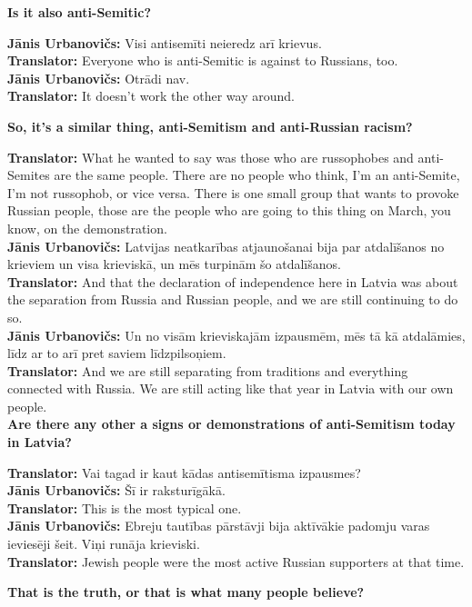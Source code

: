 \textbf{Is it also anti-Semitic?}  

\textbf{Jānis Urbanovičs:} Visi antisemīti neieredz arī krievus.\\ 
\textbf{Translator:} Everyone who is anti-Semitic is against to Russians, too.\\
\textbf{Jānis Urbanovičs:} Otrādi nav.\\ 
\textbf{Translator:} It doesn't work the other way around.  

\textbf{So, it’s a similar thing, anti-Semitism and anti-Russian racism?}  

\textbf{Translator:} What he wanted to say was those who are russophobes and anti-Semites are the same people. There are no people who think, I’m an anti-Semite, I’m not russophob, or vice versa. There is one small group that wants to provoke Russian people, those are the people who are going to this thing on March, you know, on the demonstration.\\ 
\textbf{Jānis Urbanovičs:} Latvijas neatkarības atjaunošanai bija par atdalīšanos no krieviem un visa krieviskā, un mēs turpinām šo atdalīšanos.\\
\textbf{Translator:} And that the declaration of independence here in Latvia was about the separation from Russia and Russian people, and we are still continuing to do so.\\
\textbf{Jānis Urbanovičs:} Un no visām krieviskajām izpausmēm, mēs tā kā atdalāmies, līdz ar to arī pret saviem līdzpilsoņiem.\\  
\textbf{Translator:} And we are still separating from traditions and everything connected with Russia. We are still acting like that year in Latvia with our own people.\\

\textbf{Are there any other a signs or demonstrations of anti-Semitism today in Latvia?}  

\textbf{Translator:} Vai tagad ir kaut kādas antisemītisma izpausmes?\\ 
\textbf{Jānis Urbanovičs:} Šī ir raksturīgākā.\\  
\textbf{Translator:} This is the most typical one.\\ 
\textbf{Jānis Urbanovičs:} Ebreju tautības pārstāvji bija aktīvākie padomju varas ieviesēji šeit. Viņi runāja krieviski.\\  
\textbf{Translator:} Jewish people were the most active Russian supporters at that time. 

\textbf{That is the truth, or that is what many people believe?}  

